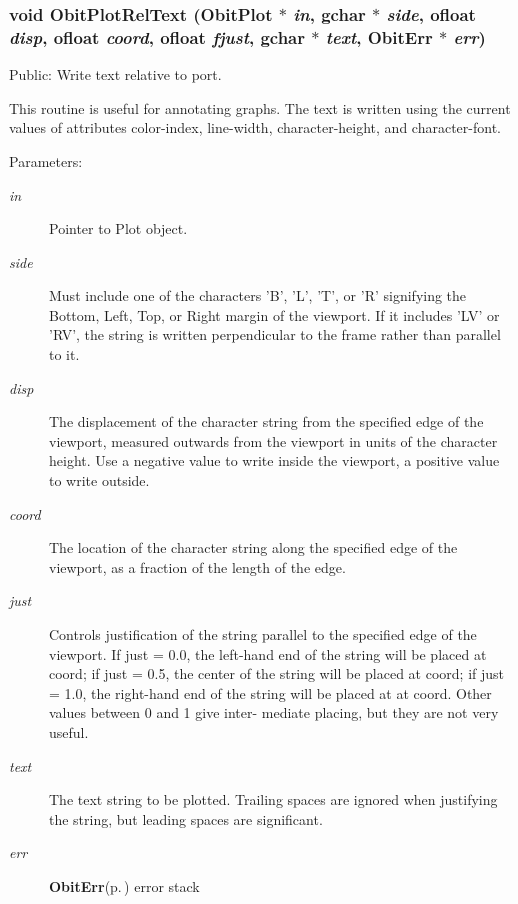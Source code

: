 \subsubsection{\setlength{\rightskip}{0pt plus 5cm}void Obit\-Plot\-Rel\-Text ({\bf Obit\-Plot} $\ast$ {\em in}, gchar $\ast$ {\em side}, {\bf ofloat} {\em disp}, {\bf ofloat} {\em coord}, {\bf ofloat} {\em fjust}, gchar $\ast$ {\em text}, {\bf Obit\-Err} $\ast$ {\em err})}\label{ObitPlot_8h_a24}


Public: Write text relative to port. 

This routine is useful for annotating graphs. The text is written using the current values of attributes color-index, line-width, character-height, and character-font. \begin{Desc}
\item[Parameters:]
\begin{description}
\item[{\em in}]Pointer to Plot object. \item[{\em side}]Must include one of the characters 'B', 'L', 'T', or 'R' signifying the Bottom, Left, Top, or Right margin of the viewport. If it includes 'LV' or 'RV', the string is written perpendicular to the frame rather than parallel to it. \item[{\em disp}]The displacement of the character string from the specified edge of the viewport, measured outwards from the viewport in units of the character height. Use a negative value to write inside the viewport, a positive value to write outside. \item[{\em coord}]The location of the character string along the specified edge of the viewport, as a fraction of the length of the edge. \item[{\em just}]Controls justification of the string parallel to the specified edge of the viewport. If just = 0.0, the left-hand end of the string will be placed at coord; if just = 0.5, the center of the string will be placed at coord; if just = 1.0, the right-hand end of the string will be placed at at coord. Other values between 0 and 1 give inter- mediate placing, but they are not very useful. \item[{\em text}]The text string to be plotted. Trailing spaces are ignored when justifying the string, but leading spaces are significant. \item[{\em err}]{\bf Obit\-Err}{\rm (p.\,\pageref{structObitErr})} error stack \end{description}
\end{Desc}
